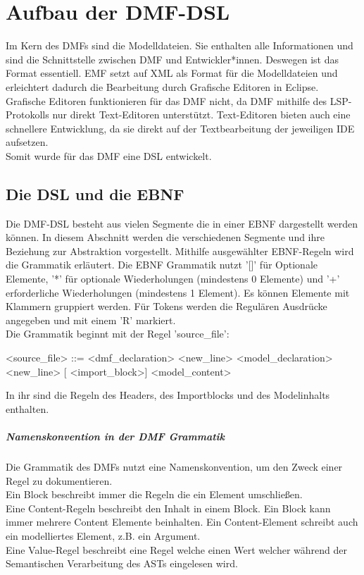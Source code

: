 \documentclass[./einleitung.tex]{subfiles}
\begin{document}
\section{Aufbau der DMF-DSL}
Im Kern des DMFs sind die Modelldateien. Sie enthalten alle Informationen und sind die Schnittstelle zwischen DMF und Entwickler*innen.
Deswegen ist das Format essentiell. EMF setzt auf XML als Format für die Modelldateien und erleichtert dadurch die Bearbeitung durch Grafische Editoren in Eclipse.
Grafische Editoren funktionieren für das DMF nicht, da DMF mithilfe des LSP-Protokolls nur direkt Text-Editoren unterstützt.
Text-Editoren bieten auch eine schnellere Entwicklung, da sie direkt auf der Textbearbeitung der jeweiligen IDE aufsetzen. \\
Somit wurde für das DMF eine DSL entwickelt.
\subsection{Die DSL und die EBNF}
Die DMF-DSL besteht aus vielen Segmente die in einer EBNF dargestellt werden können. In diesem Abschnitt werden die verschiedenen Segmente und ihre Beziehung zur Abstraktion vorgestellt. Mithilfe ausgewählter EBNF-Regeln wird die Grammatik erläutert.\newline \newline
Die EBNF Grammatik nutzt '[]' für Optionale Elemente, '*' für optionale Wiederholungen (mindestens 0 Elemente) und '+' erforderliche Wiederholungen (mindestens 1 Element).  Es können Elemente mit Klammern gruppiert werden. Für Tokens werden die Regulären Ausdrücke angegeben und mit einem 'R' markiert.\\

Die Grammatik beginnt mit der Regel 'source_file':
\begin{grammar}
<source_file> ::= <dmf_declaration> <new_line> <model_declaration> <new_line> [ <import_block>] <model_content>
\end{grammar}
In ihr sind die Regeln des Headers, des Importblocks und des Modelinhalts enthalten.

\subparagraph{Namenskonvention in der DMF Grammatik}
Die Grammatik des DMFs nutzt eine Namenskonvention, um den Zweck einer Regel zu dokumentieren.\\
Ein Block beschreibt immer die Regeln die ein Element umschließen. \\
Eine Content-Regeln beschreibt den Inhalt in einem Block. Ein Block kann immer mehrere Content Elemente beinhalten. Ein Content-Element schreibt auch ein modelliertes Element, z.B. ein Argument. \\
Eine Value-Regel beschreibt eine Regel welche einen Wert welcher während der Semantischen Verarbeitung des ASTs eingelesen wird.
\end{document}
